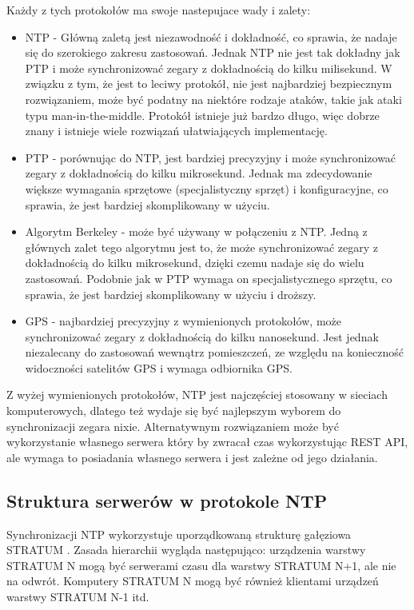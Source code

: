 \documentclass[../main.tex]{subfiles}
\begin{document}
Każdy z tych protokołów ma swoje nastepujace wady i zalety:

\newpage
\begin{itemize}
  \item NTP - Główną zaletą jest niezawodność i dokładność, co sprawia, że nadaje się do szerokiego zakresu zastosowań. 
  Jednak NTP nie jest tak dokładny jak PTP i może synchronizować zegary z dokładnością do kilku milisekund.
  W związku z tym, że jest to leciwy protokół, nie jest najbardziej bezpiecznym rozwiązaniem, 
  może być podatny na niektóre rodzaje ataków, takie jak ataki typu man-in-the-middle.
  Protokół istnieje już bardzo długo, więc dobrze znany i istnieje wiele rozwiązań ułatwiających implementację.
  \item PTP - porównując do NTP, jest bardziej precyzyjny i może synchronizować zegary z dokładnością do kilku mikrosekund.
  Jednak ma zdecydowanie większe wymagania sprzętowe (specjalistyczny sprzęt) i konfiguracyjne, co sprawia, że jest bardziej skomplikowany w użyciu.
  \item Algorytm Berkeley - może być używany w połączeniu z NTP. 
  Jedną z głównych zalet tego algorytmu jest to, że może synchronizować zegary z dokładnością do kilku mikrosekund, dzięki czemu nadaje się do wielu zastosowań.
  Podobnie jak w PTP wymaga on specjalistycznego sprzętu, co sprawia, że jest bardziej skomplikowany w użyciu i droższy.
  \item GPS - najbardziej precyzyjny z wymienionych protokołów, może synchronizować zegary z dokładnością do kilku nanosekund.
  Jest jednak niezalecany do zastosowań wewnątrz pomieszczeń, ze względu na konieczność widoczności satelitów GPS i wymaga odbiornika GPS.
\end{itemize} 

Z wyżej wymienionych protokołów, NTP jest najczęściej stosowany w sieciach komputerowych, dlatego też wydaje się być najlepszym wyborem do synchronizacji zegara nixie.
Alternatywnym rozwiązaniem może być wykorzystanie własnego serwera który by zwracał czas wykorzystując REST API, ale wymaga to posiadania własnego serwera i jest zależne od 
jego działania.

\subsection{Struktura serwerów w protokole NTP}
Synchronizacji NTP wykorzystuje uporządkowaną strukturę gałęziowa STRATUM \cite{st:serwerczasu}. 
Zasada hierarchii wygląda następująco: urządzenia warstwy STRATUM N mogą być serwerami czasu dla warstwy STRATUM N+1, ale nie na odwrót. 
Komputery STRATUM N mogą być również klientami urządzeń warstwy STRATUM N-1 itd.
\end{document}

